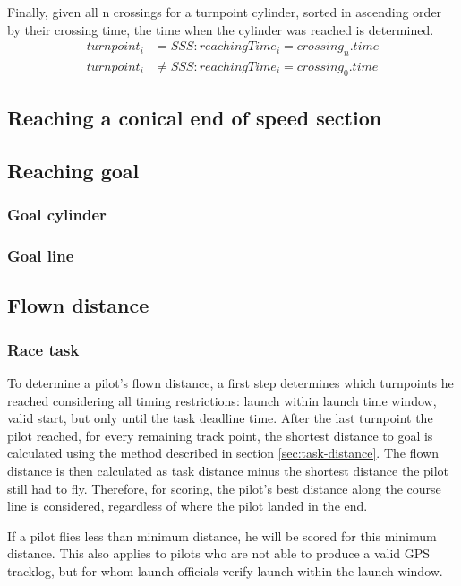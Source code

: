 \documentclass{article}
\begin{document}
Finally, given all n crossings for a turnpoint cylinder, sorted in ascending order by their crossing time, the
time when the cylinder was reached is determined.
\begin{align*}
    turnpoint_i &= SSS : reachingTime_i = crossing_n . time \\
    turnpoint_i &\neq SSS : reachingTime_i = crossing_0 . time
\end{align*}
\subsection{Reaching a conical end of speed section}
\subsection{Reaching goal}
\subsubsection{Goal cylinder}
\subsubsection{Goal line}

\subsection{Flown distance}

\subsubsection{Race task}
\label{sec:race-task}
To determine a pilot’s flown distance, a first step determines which turnpoints he reached considering
all timing restrictions: launch within launch time window, valid start, but only until the task deadline
time. After the last turnpoint the pilot reached, for every remaining track point, the shortest distance to
goal is calculated using the method described in section \ref{sec:task-distance}. The flown distance is then calculated as
task distance minus the shortest distance the pilot still had to fly. Therefore, for scoring, the pilot’s best
distance along the course line is considered, regardless of where the pilot landed in the end.

If a pilot flies less than minimum distance, he will be scored for this minimum distance. This also applies
to pilots who are not able to produce a valid GPS tracklog, but for whom launch officials verify launch
within the launch window.
\end{document}
